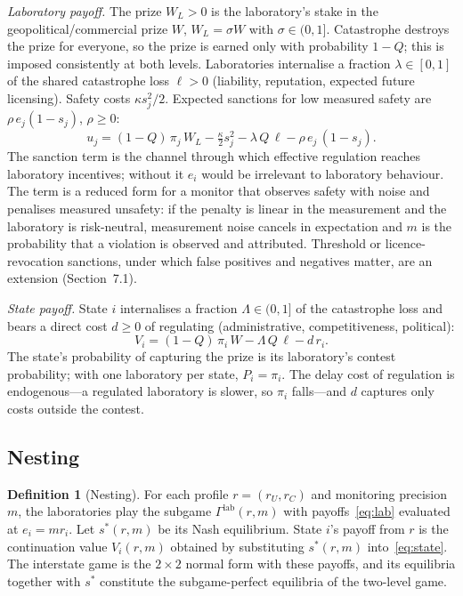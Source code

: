 \documentclass[11pt]{article}
\theoremstyle{plain}
\theoremstyle{definition}
\newtheorem{definition}{Definition}
\theoremstyle{remark}
\newcommand{\Lam}{\Lambda}
\newcommand{\WL}{W_{\!L}}
\begin{document}
\emph{Laboratory payoff.} The prize $\WL>0$ is the laboratory's stake in the geopolitical/commercial prize $W$, $\WL=\sigma W$ with $\sigma\in(0,1]$. Catastrophe destroys the prize for everyone, so the prize is earned only with probability $1-Q$; this is imposed consistently at both levels. Laboratories internalise a fraction $\lambda\in[0,1]$ of the shared catastrophe loss $\ell>0$ (liability, reputation, expected future licensing). Safety costs $\kappa s_j^2/2$. Expected sanctions for low measured safety are $\rho\,e_j(1-s_j)$, $\rho\ge0$:
\begin{equation}
u_j=(1-Q)\,\pi_j\,\WL-\tfrac{\kappa}{2}s_j^2-\lambda\,Q\,\ell-\rho\,e_j\,(1-s_j).
\label{eq:lab}
\end{equation}
The sanction term is the channel through which effective regulation reaches laboratory incentives; without it $e_i$ would be irrelevant to laboratory behaviour. The term is a reduced form for a monitor that observes safety with noise and penalises measured unsafety: if the penalty is linear in the measurement and the laboratory is risk-neutral, measurement noise cancels in expectation and $m$ is the probability that a violation is observed and attributed. Threshold or licence-revocation sanctions, under which false positives and negatives matter, are an extension (Section~7.1).

\emph{State payoff.} State $i$ internalises a fraction $\Lam\in(0,1]$ of the catastrophe loss and bears a direct cost $d\ge0$ of regulating (administrative, competitiveness, political):
\begin{equation}
V_i=(1-Q)\,\pi_i\,W-\Lam\,Q\,\ell-d\,r_i .
\label{eq:state}
\end{equation}
The state's probability of capturing the prize is its laboratory's contest probability; with one laboratory per state, $P_i=\pi_i$. The delay cost of regulation is endogenous---a regulated laboratory is slower, so $\pi_i$ falls---and $d$ captures only costs outside the contest.

\subsection{Nesting}

\begin{definition}[Nesting]
For each profile $r=(r_U,r_C)$ and monitoring precision $m$, the laboratories play the subgame $\Gamma^{\mathrm{lab}}(r,m)$ with payoffs~\eqref{eq:lab} evaluated at $e_i=mr_i$. Let $s^*(r,m)$ be its Nash equilibrium. State $i$'s payoff from $r$ is the continuation value $V_i(r,m)$ obtained by substituting $s^*(r,m)$ into~\eqref{eq:state}. The interstate game is the $2\times2$ normal form with these payoffs, and its equilibria together with $s^*$ constitute the subgame-perfect equilibria of the two-level game.
\end{definition}
\end{document}
